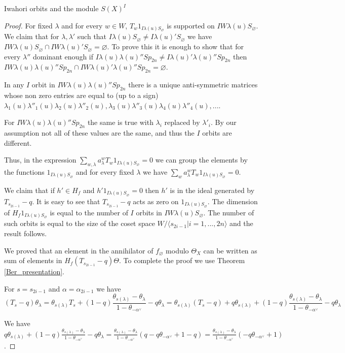 \documentclass[12pt]{article}
\newcommand{\<}{\langle}
\renewcommand{\>}{\rangle}
\renewcommand{\emptyset}{\varnothing}
\theoremstyle{plain}
\theoremstyle{definition}
\begin{document}
\begin{section}{Iwahori orbits and the module $S(X)^I$}
\begin{proof}
        For fixed $\lambda$ and for every $w\in W$, $T_w1_{I\lambda(u)S_\emptyset}$ is supported on $IW\lambda(u)S_\emptyset$. We claim that for $\lambda,\lambda'$ such that $I\lambda(u)S_\emptyset\neq I\lambda(u)'S_\emptyset$ we have $IW\lambda(u)S_\emptyset\cap IW\lambda(u)'S_\emptyset=\emptyset$. To prove this it is enough to show that for every $\lambda''$ dominant enough if $I\lambda(u)\lambda(u)''Sp_{2n}\neq I\lambda(u)'\lambda(u)''Sp_{2n}$ then $IW\lambda(u)\lambda(u)''Sp_{2n}\cap IW\lambda(u)'\lambda(u)''Sp_{2n}=\emptyset$. 
        
        In any $I$ orbit in $IW\lambda(u)\lambda(u)''Sp_{2n}$ there is a unique anti-symmetric matrices whose non zero entries are equal to (up to a sign) $\lambda_1(u)\lambda''_1(u)\lambda_2(u)\lambda''_2(u),\lambda_3(u)\lambda''_3(u)\lambda_4(u)\lambda''_4(u),...$. 
        
        For $IW\lambda(u)\lambda(u)''Sp_{2n}$ the same is true with $\lambda_i$ replaced by $\lambda'_i$. By our assumption not all of these values are the same, and thus the $I$ orbits are different.

        Thus, in the expression $\sum_{w,\lambda} a_\lambda^w T_w1_{I\lambda(u)S_\emptyset}=0$ we can group the elements by the functions $1_{I\lambda(u)S_\emptyset}$ and for every fixed $\lambda$ we have $\sum_w a_\lambda^w T_w1_{I\lambda(u)S_\emptyset}=0$. 

        We claim that if $h'\in H_f$ and $h'1_{I\lambda(u)S_\emptyset}=0$ then $h'$ is in the ideal generated by $T_{s_{2i-1}}-q$. It is easy to see that $T_{s_{2i-1}}-q$ acts as zero on $1_{I\lambda(u)S_\emptyset}$. The dimension of $H_f1_{I\lambda(u)S_\emptyset}$ is equal to the number of $I$ orbits in $IW\lambda(u)S_\emptyset$. The number of such orbits is equal to the size of the coset space $W/\langle s_{2i-1}|i=1,...,2n\rangle$ and the result follows. 

        We proved that an element in the annihilator of $f_\emptyset$ modulo $\Theta_X$ can be written as sum of elements in $H_f(T_{s_{2i-1}}-q)\Theta$. To complete the proof we use Theorem \ref{Ber_presentation}.

        For $s=s_{2i-1}$ and $\alpha=\alpha_{2i-1}$ we have $$(T_s-q)\theta_\lambda=\theta_{s(\lambda)}T_s+(1-q)\frac{\theta_{s(\lambda)}-\theta_{\lambda}}{1-\theta_{-\alpha^\vee}}-q\theta_\lambda=\theta_{s(\lambda)}(T_s-q)+q\theta_{s(\lambda)}+(1-q)\frac{\theta_{s(\lambda)}-\theta_{\lambda}}{1-\theta_{-\alpha^\vee}}-q\theta_\lambda$$
        
        We have $q\theta_{s(\lambda)}+(1-q)\frac{\theta_{s(\lambda)}-\theta_{\lambda}}{1-\theta_{-\alpha^\vee}}-q\theta_\lambda=\frac{\theta_{s(\lambda)}-\theta_{\lambda}}{1-\theta_{-\alpha^\vee}}(q-q\theta_{-\alpha^\vee}+1-q)=\frac{\theta_{s(\lambda)}-\theta_{\lambda}}{1-\theta_{-\alpha^\vee}}(-q\theta_{-\alpha^\vee}+1)$. 


\end{proof}
\end{section}
\end{document}
